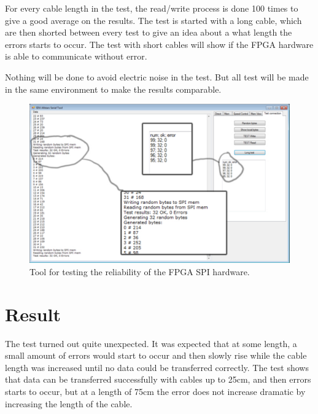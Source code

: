 For every cable length in the test, the read/write process is done 100 times to give a good average on the results. The test is started with a long cable, which are then shorted between every test to give an idea about a what length the errors starts to occur. The test with short cables will show if the FPGA hardware is able to communicate without error.

Nothing will be done to avoid electric noise in the test. But all test will be made in the same environment to make the results comparable.

\begin{figure}[htb] 
	\centering
	\includegraphics[width=\textwidth,trim=0 0 0 0]{graphics/spi_testapplication.pdf} %
	\caption{Tool for testing the reliability of the FPGA SPI hardware.}
	\label{fig:spi_testapplication}			%
\end{figure}


\section{Result}
The test turned out quite unexpected. It was expected that at some length, a small amount of errors would start to occur and then slowly rise while the cable length was increased until no data could be transferred correctly. The test shows that data can be transferred successfully with cables up to 25cm, and then errors starts to occur, but at a length of 75cm the error does not increase dramatic by increasing the length of the cable.

